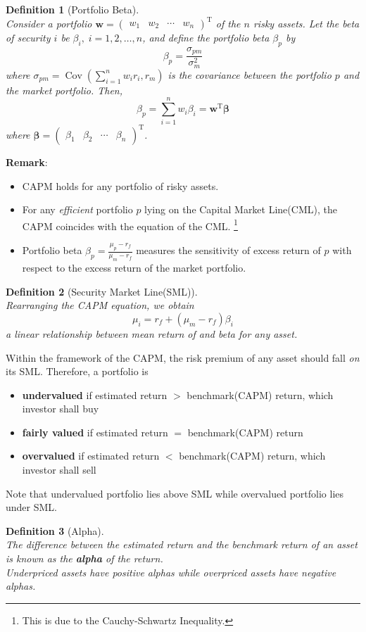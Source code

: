 \documentclass[12pt]{article}
\newtheorem{definition}{Definition}[section]
\theoremstyle{definition}
\DeclareMathOperator{\cov}{Cov}
\begin{document}
\begin{definition}[Portfolio Beta]
\hfill\\\normalfont Consider a portfolio $\mathbf{w}=\begin{pmatrix}w_1&w_2&\cdots&w_n\end{pmatrix}^\text{T}$ of the $n$ risky assets. Let the beta of security $i$ be $\beta_i,\;i=1,2,\ldots, n$, and define the portfolio beta $\beta_p$ by
\[
\beta_p=\frac{\sigma_{pm}}{\sigma_m^2}
\]
where $\sigma_{pm}=\cov(\sum_{i=1}^n w_ir_i,r_m)$ is the covariance between the portfolio $p$ and the market portfolio. Then,
\[
\beta_p=\sum_{i=1}^n w_i\beta_i=\mathbf{w}^\text{T}\bm{\beta}
\]
where $\bm{\beta}=\begin{pmatrix}\beta_1&\beta_2&\cdots&\beta_n\end{pmatrix}^\text{T}$.
\end{definition}
\textbf{Remark}:
\begin{itemize}
  \item CAPM holds for any portfolio of risky assets.
  \item For any \textit{efficient} portfolio $p$ lying on the Capital Market Line(CML), the CAPM coincides with the equation of the CML. \footnote{This is due to the Cauchy-Schwartz Inequality.}
  \item Portfolio beta $\beta_p = \frac{\mu_p-r_f}{\mu_m-r_f}$ measures the sensitivity of excess return of $p$ with respect to the excess return of the market portfolio.
\end{itemize}
\begin{definition}[Security Market Line(SML)]
\hfill\\\normalfont Rearranging the CAPM equation, we obtain
\[
\mu_i=r_f+(\mu_m-r_f)\beta_i
\]
a linear relationship between mean return of and beta for any asset.
\end{definition}
Within the framework of the CAPM, the risk premium of any asset should fall \textit{on} its SML. Therefore, a portfolio is
\begin{itemize}
  \item \textbf{undervalued} if estimated return $>$ benchmark(CAPM) return, which investor shall buy
  \item \textbf{fairly valued} if estimated return $=$ benchmark(CAPM) return
  \item \textbf{overvalued} if estimated return $<$ benchmark(CAPM) return, which investor shall sell
\end{itemize}
Note that undervalued portfolio lies above SML while overvalued portfolio lies under SML.
\begin{definition}[Alpha]
\hfill\\\normalfont The difference between the estimated return and the benchmark return of an asset is known as the \textbf{alpha} of the return.\\Underpriced assets have positive alphas while overpriced assets have negative alphas.
\end{definition}
\end{document}
